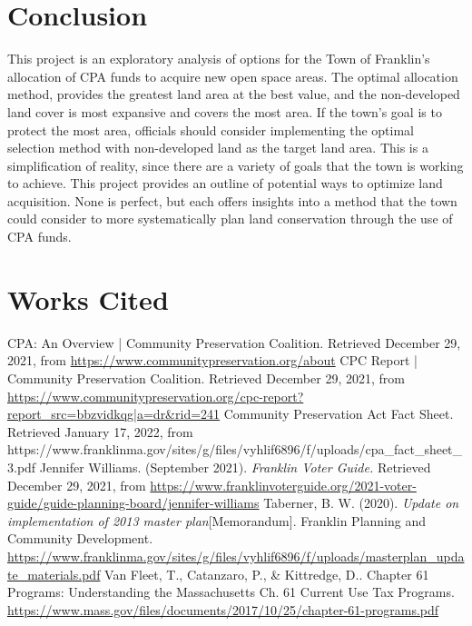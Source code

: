 \documentclass[12pt, stu, floatsintext,table]{apa7}
\begin{document}
\section{Conclusion}
This project is an exploratory analysis of options for the Town of Franklin's allocation of CPA funds to acquire new open space areas. The optimal allocation method, provides the greatest land area at the best value, and the non-developed land cover is most expansive and covers the most area. If the town's goal is to protect the most area, officials should consider implementing the optimal selection method with non-developed land as the target land area. This is a simplification of reality, since there are a variety of goals that the town is working to achieve. This project provides an outline of potential ways to optimize land acquisition. None is perfect, but each offers insights into a method that the town could consider to more systematically plan land conservation through the use of CPA funds.  

\section{Works Cited}
\onehalfspacing
\begin{flushleft}
CPA: An Overview | Community Preservation Coalition. Retrieved December 29, 2021, from \url{https://www.communitypreservation.org/about}  
\newline
\newline
CPC Report | Community Preservation Coalition. Retrieved December 29, 2021, from \url{https://www.communitypreservation.org/cpc-report?report_src=bbzvidkqg|a=dr&rid=241} 
\newline 
\newline
Community Preservation Act Fact Sheet. Retrieved January 17, 2022, from https://www.franklinma.gov/sites/g/files/vyhlif6896/f/uploads/cpa_fact_sheet_3.pdf
\newline 
\newline
Jennifer Williams. (September 2021). \emph{Franklin Voter Guide.} Retrieved December 29, 2021, from \url{https://www.franklinvoterguide.org/2021-voter-guide/guide-planning-board/jennifer-williams}  
\newline
\newline
Taberner, B. W. (2020). \emph{Update on implementation of 2013 master plan}[Memorandum]. Franklin Planning and Community Development. \url{https://www.franklinma.gov/sites/g/files/vyhlif6896/f/uploads/masterplan_update_materials.pdf}  
\newline
\newline
Van Fleet, T., Catanzaro, P., \& Kittredge, D.. Chapter 61 Programs: Understanding the Massachusetts Ch. 61 Current Use Tax Programs. \url{https://www.mass.gov/files/documents/2017/10/25/chapter-61-programs.pdf}
\end{flushleft}
\end{document}
